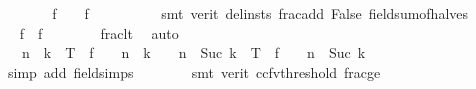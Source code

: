 \begin{isabellebody}
\ \ \ \ \isamarkupfalse%
\ \isamarkupfalse%
\ {\isachardoublequoteopen}{\isacharquery}{\kern0pt}f{\isacharprime}{\kern0pt}\ {\isacharequal}{\kern0pt}\ {}\ {\isacharasterisk}{\kern0pt}\ {\isacharquery}{\kern0pt}f\ {\isacharminus}{\kern0pt}\ {}{\isachardoublequoteclose}\isanewline
\ \ \ \ \ \ \isamarkupfalse%
\ {\isacharparenleft}{\kern0pt}smt\ {\isacharparenleft}{\kern0pt}verit{\isacharcomma}{\kern0pt}\ del{\isacharunderscore}{\kern0pt}insts{\isacharparenright}{\kern0pt}\ frac{\isacharunderscore}{\kern0pt}add\ False\ field{\isacharunderscore}{\kern0pt}sum{\isacharunderscore}{\kern0pt}of{\isacharunderscore}{\kern0pt}halves{\isacharparenright}{\kern0pt}\isanewline
\ \ \ \ \isamarkupfalse%
\ \isamarkupfalse%
\ {\isachardoublequoteopen}{\isacharquery}{\kern0pt}f{\isacharprime}{\kern0pt}\ {\isacharless}{\kern0pt}\ {\isacharquery}{\kern0pt}f{\isachardoublequoteclose}\isanewline
\ \ \ \ \ \ \isamarkupfalse%
\ frac{\isacharunderscore}{\kern0pt}lt{\isacharunderscore}{\kern0pt}{}\ \isamarkupfalse%
\ auto\isanewline
\ \ \ \ \isamarkupfalse%
\ \isamarkupfalse%
\ {\isachardoublequoteopen}{\isacharparenleft}{\kern0pt}{}\ {\isacharcircum}{\kern0pt}\ {\isacharparenleft}{\kern0pt}n\ {\isacharplus}{\kern0pt}\ k{\isacharparenright}{\kern0pt}\ {\isacharasterisk}{\kern0pt}\ T\ {\isacharminus}{\kern0pt}\ {\isacharquery}{\kern0pt}f{\isacharparenright}{\kern0pt}\ {\isacharslash}{\kern0pt}\ {}\ {\isacharcircum}{\kern0pt}\ {\isacharparenleft}{\kern0pt}n\ {\isacharplus}{\kern0pt}\ k{\isacharparenright}{\kern0pt}\ {\isacharless}{\kern0pt}\ {\isacharparenleft}{\kern0pt}{}\ {\isacharcircum}{\kern0pt}\ {\isacharparenleft}{\kern0pt}n\ {\isacharplus}{\kern0pt}\ {\isacharparenleft}{\kern0pt}Suc\ k{\isacharparenright}{\kern0pt}{\isacharparenright}{\kern0pt}\ {\isacharasterisk}{\kern0pt}\ T\ {\isacharminus}{\kern0pt}\ {\isacharquery}{\kern0pt}f{\isacharprime}{\kern0pt}{\isacharparenright}{\kern0pt}\ {\isacharslash}{\kern0pt}\ {}\ {\isacharcircum}{\kern0pt}\ {\isacharparenleft}{\kern0pt}n\ {\isacharplus}{\kern0pt}\ Suc\ k{\isacharparenright}{\kern0pt}{\isachardoublequoteclose}\isanewline
\ \ \ \ \ \ \isamarkupfalse%
\ {\isacharparenleft}{\kern0pt}simp\ add{\isacharcolon}{\kern0pt}\ field{\isacharunderscore}{\kern0pt}simps{\isacharparenright}{\kern0pt}\isanewline
\ \ \ \ \ \ \isamarkupfalse%
\ {\isacharparenleft}{\kern0pt}smt\ {\isacharparenleft}{\kern0pt}verit{\isacharcomma}{\kern0pt}\ ccfv{\isacharunderscore}{\kern0pt}threshold{\isacharparenright}{\kern0pt}\ frac{\isacharunderscore}{\kern0pt}ge{\isacharunderscore}{\kern0pt}{}{\isacharparenright}{\kern0pt}\isanewline

\end{isabellebody}
